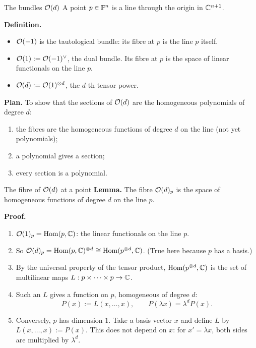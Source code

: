 \begin{frame}{The bundles \(\mathcal O(d)\)}
\label{fr:prov-od-1}
A point \(p\in\mathbb P^n\) is a line through the origin in \(\mathbb C^{n+1}\).
\par\medskip
\textbf{Definition.}
\begin{itemize}
\setlength{\itemsep}{10pt}
\item \(\mathcal O(-1)\) is the tautological bundle: its fibre at \(p\) is the line \(p\) itself.
\item \(\mathcal O(1):=\mathcal O(-1)^\vee\), the dual bundle. Its fibre at \(p\) is the space of linear functionals on the line \(p\).
\item \(\mathcal O(d):=\mathcal O(1)^{\otimes d}\), the \(d\)-th tensor power.
\end{itemize}
\par\medskip
\textbf{Plan.} To show that the sections of \(\mathcal O(d)\) are the homogeneous polynomials of degree \(d\):
\begin{enumerate}
\item the fibres are the homogeneous functions of degree \(d\) on the line (not yet polynomials);
\item a polynomial gives a section;
\item every section is a polynomial.
\end{enumerate}
\end{frame}

\begin{frame}{The fibre of \(\mathcal O(d)\) at a point}
\label{fr:prov-od-2}
\textbf{Lemma.} The fibre \(\mathcal O(d)_p\) is the space of homogeneous functions of degree \(d\) on the line \(p\).
\par\medskip
\textbf{Proof.}
\begin{enumerate}
\setlength{\itemsep}{6pt}
\item \(\mathcal O(1)_p=\operatorname{Hom}(p,\mathbb C)\): the linear functionals on the line \(p\).
\item So \(\mathcal O(d)_p=\operatorname{Hom}(p,\mathbb C)^{\otimes d}\cong\operatorname{Hom}(p^{\otimes d},\mathbb C)\). (True here because \(p\) has a basis.)
\item By the universal property of the tensor product, \(\operatorname{Hom}(p^{\otimes d},\mathbb C)\) is the set of multilinear maps \(L:p\times\cdots\times p\to\mathbb C\).
\item Such an \(L\) gives a function on \(p\), homogeneous of degree \(d\):
\[
P(x):=L(x,\ldots,x),\qquad P(\lambda x)=\lambda^dP(x).
\]
\item Conversely, \(p\) has dimension \(1\). Take a basis vector \(x\) and define \(L\) by \(L(x,\ldots,x):=P(x)\). This does not depend on \(x\): for \(x'=\lambda x\), both sides are multiplied by \(\lambda^d\).
\end{enumerate}
\end{frame}


